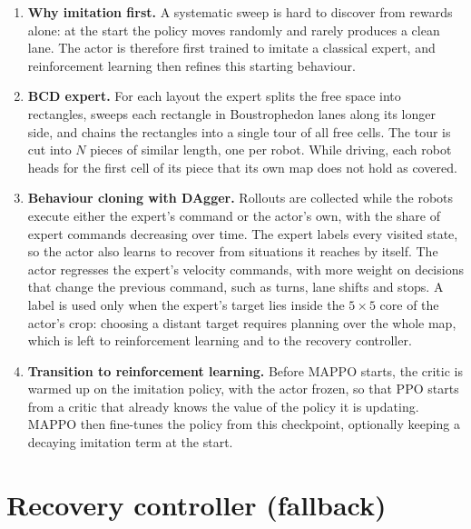 \documentclass[11pt,a4paper]{article}
\begin{document}
\begin{enumerate}[label=\textbf{\arabic*.},resume]

\item \textbf{Why imitation first.}
A systematic sweep is hard to discover from rewards alone: at the start the
policy moves randomly and rarely produces a clean lane. The actor is
therefore first trained to imitate a classical expert, and reinforcement
learning then refines this starting behaviour.

\item \textbf{BCD expert.}
For each layout the expert splits the free space into rectangles, sweeps
each rectangle in Boustrophedon lanes along its longer side, and chains the
rectangles into a single tour of all free cells. The tour is cut into $N$
pieces of similar length, one per robot. While driving, each robot heads for
the first cell of its piece that its own map does not hold as covered.

\item \textbf{Behaviour cloning with DAgger.}
Rollouts are collected while the robots execute either the expert's command
or the actor's own, with the share of expert commands decreasing over time.
The expert labels every visited state, so the actor also learns to recover
from situations it reaches by itself. The actor regresses the expert's
velocity commands, with more weight on decisions that change the previous
command, such as turns, lane shifts and stops. A label is used only when the
expert's target lies inside the $5\times5$ core of the actor's crop: choosing
a distant target requires planning over the whole map, which is left to
reinforcement learning and to the recovery controller.

\item \textbf{Transition to reinforcement learning.}
Before MAPPO starts, the critic is warmed up on the imitation policy, with the
actor frozen, so that PPO starts from a critic that already knows the value
of the policy it is updating. MAPPO then fine-tunes the policy from this
checkpoint, optionally keeping a decaying imitation term at the start.

\end{enumerate}

\section{Recovery controller (fallback)}
\end{document}

